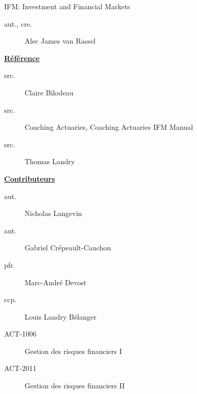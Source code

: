 \begin{contrib}{IFM: Investment and Financial Markets}
\begin{description}
	\item[aut., cre.] Alec James van Rassel
\end{description}

\textbf{\underline{Référence}}
\begin{description}
	\item[src.] Claire Bilodeau
	\item[src.] Coaching Actuaries, Coaching Actuaries IFM Manual
	\item[src.] Thomas Landry	
\end{description}

\textbf{\underline{Contributeurs}}
\begin{description}
	\item[aut.] Nicholas Langevin
	\item[aut.] Gabriel Crépeault-Cauchon 
	\item[pfr.]	Marc-André Devost
	\item[ccp.]	Louis Landry Bélanger
\end{description}
\end{contrib}

\begin{distributions}
\begin{description}
	\item[ACT-1006]	Gestion des risques financiers I
	\item[ACT-2011]	Gestion des risques financiers II
\end{description}
\end{distributions}